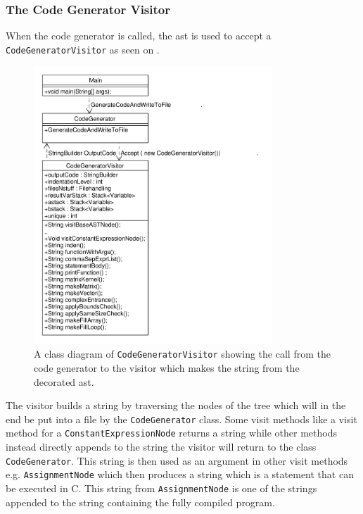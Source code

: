 \subsubsection*{The Code Generator Visitor}
When the code generator is called, the \acrshort{ast} is used to accept a \texttt{CodeGeneratorVisitor} as seen on .

\begin{figure}[!ht]
\centering
 \includegraphics[width=0.8\textwidth]{figures/ClassDiagrams/CodeGeneratorCall.pdf}%
\caption{A class diagram of \texttt{CodeGeneratorVisitor} showing the call from the code generator to the visitor which makes the string from the decorated \acrshort{ast}.}\label{fig:CodeGeneratorVisitor}
\vspace{-15pt}
\end{figure}

The visitor builds a string by traversing the nodes of the tree which will in the end be put into a file by the \texttt{CodeGenerator} class.
Some visit methods like a visit method for a \texttt{ConstantExpressionNode} returns a string while other methods instead directly appends to the string the visitor will return to the class \texttt{CodeGenerator}.
This string is then used as an argument in other visit methods e.g. \texttt{AssignmentNode} which then produces a string which is a statement that can be executed in C. 
This string from \texttt{AssignmentNode} is one of the strings appended to the string containing the fully compiled program.

